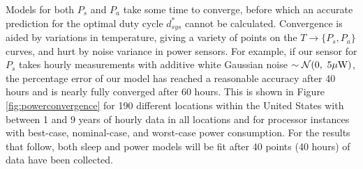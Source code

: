 Models for both $P_s$ and $P_a$ take some time to converge, before which an accurate prediction for the optimal duty cycle $d_{sys}^*$ cannot be calculated. Convergence is aided by variations in temperature, giving a variety of points on the $T\rightarrow\{P_s, P_a\}$ curves, and hurt by noise variance in power sensors.  For example, if our sensor for $P_s$ takes hourly measurements with additive white Gaussian noise $\sim\normal(0, ~5\mu\text{W})$, the percentage error of our model has reached a reasonable accuracy after 40 hours and is nearly fully converged after 60 hours.  This is shown in Figure \ref{fig:powerconvergence} for 190 different locations within the United States with between 1 and 9 years of hourly data in all locations and for processor instances with best-case, nominal-case, and worst-case power consumption. For the results that follow, both sleep and power models will be fit after 40 points (40 hours) of data have been collected.  


